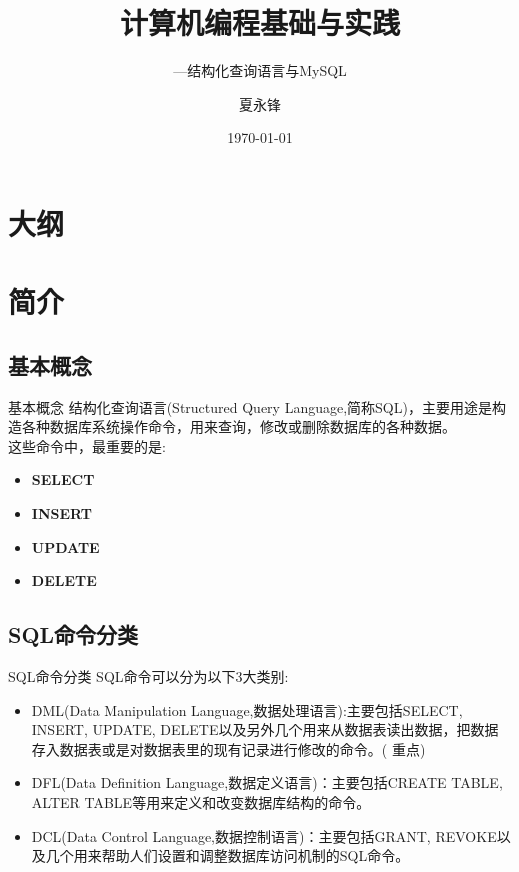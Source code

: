 \documentclass[CJK]{beamer}
\begin{document}
\begin{CJK*}{UTF8}{gbsn}

\title{计算机编程基础与实践}
\subtitle{---结构化查询语言与MySQL}
\author{夏永锋}
\date{\today}

\begin{frame}
	\titlepage
\end{frame}

\section*{大纲}
\begin{frame}
	\tableofcontents
\end{frame}

\section{简介}

\subsection{基本概念}
\begin{frame}{基本概念}
结构化查询语言(Structured Query Language,简称SQL)，主要用途是构造各种数据库系统操作命令，用来查询，修改或删除数据库的各种数据。\\
这些命令中，最重要的是:
	\begin{itemize}
		\item {\bf SELECT}
		\item {\bf INSERT}
		\item {\bf UPDATE}
		\item {\bf DELETE}
	\end{itemize}
\end{frame}

\subsection{SQL命令分类}
\begin{frame}{SQL命令分类}
SQL命令可以分为以下3大类别:
	\begin{itemize}
		\item DML(Data Manipulation Language,数据处理语言):主要包括SELECT, INSERT, UPDATE, DELETE以及另外几个用来从数据表读出数据，把数据存入数据表或是对数据表里的现有记录进行修改的命令。({\color{red} 重点})
		\item DFL(Data Definition Language,数据定义语言)：主要包括CREATE TABLE, ALTER TABLE等用来定义和改变数据库结构的命令。
		\item DCL(Data Control Language,数据控制语言)：主要包括GRANT, REVOKE以及几个用来帮助人们设置和调整数据库访问机制的SQL命令。
	\end{itemize}
\end{frame}


\end{CJK*}
\end{document}

